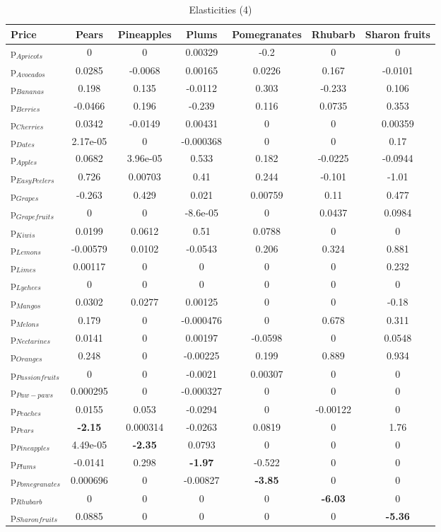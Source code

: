 \documentclass[11pt]{article}
\begin{document}
\begin{table}[h]
\caption{Elasticities (4)}
\label{table:elasticities 4}
\begin{center}
\begin{tabular}{lcccccc} \hline \hline
Price &Pears &Pineapples &Plums &Pomegranates &Rhubarb &Sharon fruits \\ \hline
p$_{Apricots}$ &0 &0 &0.00329 &-0.2 &0 &0 \\
p$_{Avocados}$ &0.0285 &-0.0068 &0.00165 &0.0226 &0.167 &-0.0101 \\
p$_{Bananas}$ &0.198 &0.135 &-0.0112 &0.303 &-0.233 &0.106 \\
p$_{Berries}$ &-0.0466 &0.196 &-0.239 &0.116 &0.0735 &0.353 \\
p$_{Cherries}$ &0.0342 &-0.0149 &0.00431 &0 &0 &0.00359 \\
p$_{Dates}$ &2.17e-05 &0 &-0.000368 &0 &0 &0.17 \\
p$_{Apples}$ &0.0682 &3.96e-05 &0.533 &0.182 &-0.0225 &-0.0944 \\
p$_{Easy Peelers}$ &0.726 &0.00703 &0.41 &0.244 &-0.101 &-1.01 \\
p$_{Grapes}$ &-0.263 &0.429 &0.021 &0.00759 &0.11 &0.477 \\
p$_{Grapefruits}$ &0 &0 &-8.6e-05 &0 &0.0437 &0.0984 \\
p$_{Kiwis}$ &0.0199 &0.0612 &0.51 &0.0788 &0 &0 \\
p$_{Lemons}$ &-0.00579 &0.0102 &-0.0543 &0.206 &0.324 &0.881 \\
p$_{Limes}$ &0.00117 &0 &0 &0 &0 &0.232 \\
p$_{Lychees}$ &0 &0 &0 &0 &0 &0 \\
p$_{Mangos}$ &0.0302 &0.0277 &0.00125 &0 &0 &-0.18 \\
p$_{Melons}$ &0.179 &0 &-0.000476 &0 &0.678 &0.311 \\
p$_{Nectarines}$ &0.0141 &0 &0.00197 &-0.0598 &0 &0.0548 \\
p$_{Oranges}$ &0.248 &0 &-0.00225 &0.199 &0.889 &0.934 \\
p$_{Passion fruits}$ &0 &0 &-0.0021 &0.00307 &0 &0 \\
p$_{Paw-paws}$ &0.000295 &0 &-0.000327 &0 &0 &0 \\
p$_{Peaches}$ &0.0155 &0.053 &-0.0294 &0 &-0.00122 &0 \\
p$_{Pears}$ &\textbf{-2.15} &0.000314 &-0.0263 &0.0819 &0 &1.76 \\
p$_{Pineapples}$ &4.49e-05 &\textbf{-2.35} &0.0793 &0 &0 &0 \\
p$_{Plums}$ &-0.0141 &0.298 &\textbf{-1.97} &-0.522 &0 &0 \\
p$_{Pomegranates}$ &0.000696 &0 &-0.00827 &\textbf{-3.85} &0 &0 \\
p$_{Rhubarb}$ &0 &0 &0 &0 &\textbf{-6.03} &0 \\
p$_{Sharon fruits}$ &0.0885 &0 &0 &0 &0 &\textbf{-5.36} \\
\end{tabular}
\end{center}
\end{table}
\end{document}
